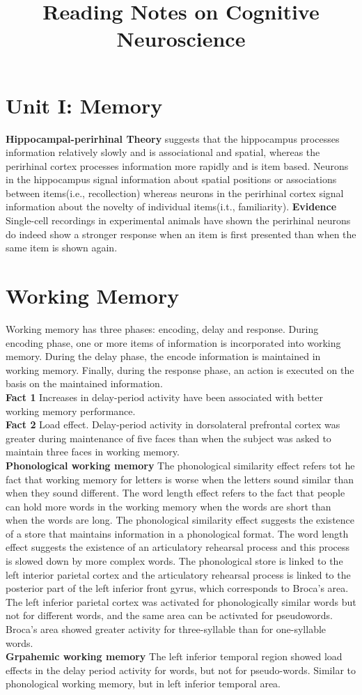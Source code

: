 \documentclass[12pt, reqno]{amsart}
\title{Reading Notes on Cognitive Neuroscience}
\author{}
\date{}
\begin{document}
\maketitle
\section{Unit I: Memory}
\textbf{Hippocampal-perirhinal Theory} suggests that the hippocampus processes information relatively slowly and is associational and spatial, whereas the perirhinal cortex processes information more rapidly and is item based.  Neurons in the hippocampus signal information about spatial positions or associations between items(i.e., recollection) whereas neurons in the perirhinal cortex signal information about the novelty of individual items(i.t., familiarity). 
\textbf{Evidence} Single-cell recordings in experimental animals have shown the perirhinal neurons do indeed show a stronger response when an item is first presented than when the same item is shown again. 

\section{Working Memory}
Working memory has three phases: encoding, delay and response.  During encoding phase, one or more items of information is incorporated into working memory. During the delay phase, the encode information is maintained in working memory. Finally, during the response phase, an action is executed on the basis on the maintained information. \\
\textbf{Fact 1} Increases in delay-period activity have been associated with better working memory performance. \\
\textbf{Fact 2} Load effect.  Delay-period activity in dorsolateral prefrontal cortex was greater during maintenance of five faces than when the subject was asked to maintain three faces in working memory.\\

\noindent \textbf{Phonological working memory} The  phonological similarity effect refers tot he fact that working memory for letters is worse when the letters sound similar than when they sound different. The word length effect refers to the fact that people can hold more words in the working memory when the words are short than when the words are long. The phonological similarity effect suggests the existence of a store that maintains information in a phonological format. The word length effect suggests the existence of an articulatory rehearsal process and this process is slowed down by more complex words. The phonological store is linked to the left interior parietal cortex and the articulatory rehearsal process is linked to the posterior part of the left inferior front gyrus, which corresponds to Broca's area. The left inferior parietal cortex was activated for phonologically similar words but not for different words, and the same area can be activated for pseudowords. Broca's area showed greater activity for three-syllable than for one-syllable words. \\

\noindent \textbf{Grpahemic working memory} The left inferior temporal region showed load effects in the delay period activity for words, but not for pseudo-words. Similar to phonological working memory, but in left inferior temporal area.
\end{document}
